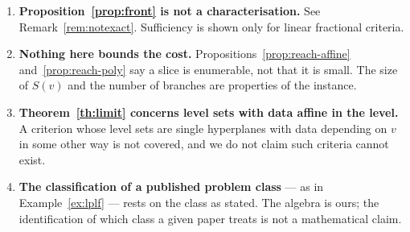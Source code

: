 \documentclass[11pt,a4paper]{article}
\theoremstyle{plain}
\theoremstyle{definition}
\begin{document}
\begin{enumerate}[itemsep=3pt]
\item \textbf{Proposition~\ref{prop:front} is not a characterisation.}  See
      Remark~\ref{rem:notexact}.  Sufficiency is shown only for linear
      fractional criteria.
\item \textbf{Nothing here bounds the cost.}  Propositions~\ref{prop:reach-affine}
      and~\ref{prop:reach-poly} say a slice is enumerable, not that it is
      small.  The size of $S(v)$ and the number of branches are properties of
      the instance.
\item \textbf{Theorem~\ref{th:limit} concerns level sets with data affine in
      the level.}  A criterion whose level sets are single hyperplanes with
      data depending on $v$ in some other way is not covered, and we do not
      claim such criteria cannot exist.
\item \textbf{The classification of a published problem class} --- as in
      Example~\ref{ex:lplf} --- rests on the class as stated.  The algebra is
      ours; the identification of which class a given paper treats is not a
      mathematical claim.
\end{enumerate}
\end{document}
